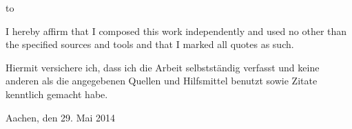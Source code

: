 \thispagestyle{empty}
\vspace*{36\baselineskip}
\hbox to \textwidth{\hrulefill}

I hereby affirm that I composed this work independently and used no other than the specified sources and tools and that I marked all quotes as such.

Hiermit versichere ich, dass ich die Arbeit selbstständig verfasst und keine anderen als die angegebenen Quellen und Hilfsmittel benutzt sowie Zitate kenntlich gemacht habe.

Aachen, den 29. Mai 2014

